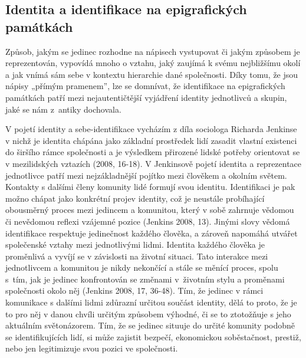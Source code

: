 \subsection[identita-a-identifikace-na-epigrafických-památkách]{Identita a identifikace na epigrafických památkách}

Způsob, jakým se jedinec rozhodne na nápisech vystupovat či jakým způsobem je reprezentován, vypovídá mnoho o vztahu, jaký zaujímá k svému nejbližšímu okolí a jak vnímá sám sebe v kontextu hierarchie dané společnosti. Díky tomu, že jsou nápisy „přímým pramenem”, lze se domnívat, že identifikace na epigrafických památkách patří mezi nejautentičtější vyjádření identity jednotlivců a skupin, jaké se nám z~antiky dochovala.

V pojetí identity a sebe-identifikace vycházím z díla sociologa Richarda Jenkinse v nichž je identita chápána jako základní prostředek lidí zasadit vlastní existenci do širšího rámce společnosti a je výsledkem přirozené lidské potřeby orientovat se v mezilidských vztazích (2008, 16-18). V Jenkinsově pojetí identita a reprezentace jednotlivce patří mezi nejzákladnější pojítko mezi člověkem a okolním světem. Kontakty s dalšími členy komunity lidé formují svou identitu. Identifikaci je pak možno chápat jako konkrétní projev identity, což je neustále probíhající obousměrný proces mezi jedincem a komunitou, který v sobě zahrnuje vědomou či nevědomou reflexi vzájemné pozice (Jenkins 2008, 13). Jinými slovy vědomá identifikace respektuje jedinečnost každého člověka, a zároveň napomáhá utvářet společenské vztahy mezi jednotlivými lidmi. Identita každého člověka je proměnlivá a vyvíjí se v závislosti na životní situaci. Tato interakce mezi jednotlivcem a komunitou je nikdy nekončící a stále se měnící proces, spolu s~tím, jak je jedinec konfrontován se změnami v~životním stylu a proměnami společnosti okolo něj (Jenkins 2008, 17, 36-48). Tím, že jedinec v rámci komunikace s dalšími lidmi zdůrazní určitou součást identity, dělá to proto, že je to pro něj v danou chvíli určitým způsobem výhodné, či se to ztotožňuje s jeho aktuálním světonázorem. Tím, že se jedinec situuje do určité komunity podobně se identifikujících lidí, si může zajistit bezpečí, ekonomickou soběstačnost, prestiž, nebo jen legitimizuje svou pozici ve společnosti.

